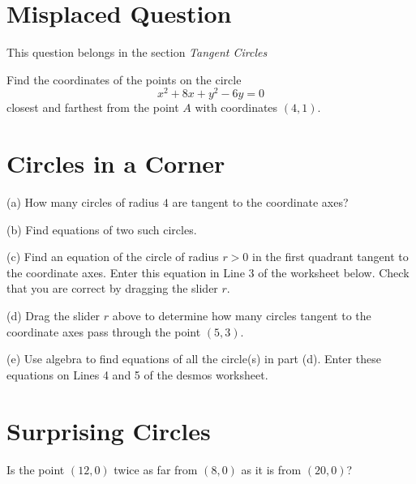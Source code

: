 \documentclass{ximera}
\begin{document}
\section*{Misplaced Question}
This question belongs in the section \emph{Tangent Circles}

\begin{question}
Find the coordinates of the points on the circle
\[
     x^2 + 8x + y^2 - 6y = 0
\]
closest and farthest from the point $A$ with coordinates $(4,1)$.
\end{question}



\section*{Circles in a Corner}
\begin{question}  \label{Q3442dsfdsf55t}
(a) How many circles of radius $4$ are tangent to the coordinate axes? 

(b) Find equations of two such circles.

(c) Find an equation of the circle of radius $r > 0$ in the first quadrant tangent to the coordinate axes. Enter this equation in Line 3 of the worksheet below. Check that you are correct by dragging the slider $r$.

\begin{exploration}
\begin{onlineOnly}
    \begin{center}
\end{center}
\end{onlineOnly}

(d) Drag the slider $r$ above to determine how many circles tangent to the coordinate axes pass through the point $(5,3)$. 

(e) Use algebra to find equations of all the circle(s) in part (d). Enter these equations on Lines 4 and 5 of the desmos worksheet.



\end{exploration}

\end{question}




\section*{Surprising Circles}

\begin{exercise}  
  Is the point $(12,0)$ twice as far from $(8,0)$ as it is from $(20,0)$? 
  \begin{multipleChoice}  
        \end{multipleChoice}  
\end{exercise}  
\end{document}
